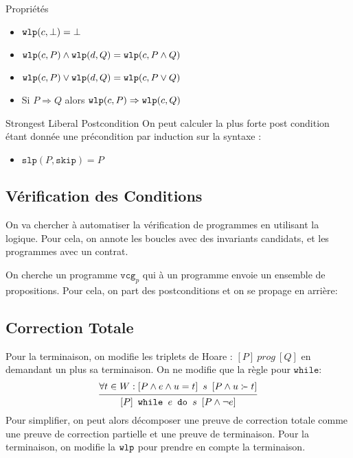 \documentclass{cours}
\begin{document}
\begin{propositionfr}{Propriétés}{}
	\begin{itemize}
		\item $\texttt{wlp}(c, \bot) = \bot$
		\item $\texttt{wlp}(c, P) \land \texttt{wlp}(d, Q) = \texttt{wlp}(c, P \land Q)$
		\item $\texttt{wlp}(c, P) \lor \texttt{wlp}(d, Q) = \texttt{wlp}(c, P \lor Q)$
		\item Si $P \Rightarrow Q$ alors $\texttt{wlp}(c, P) \Rightarrow \texttt{wlp}(c, Q)$
	\end{itemize}
	
\end{propositionfr}
\newcommand{\slp}{\texttt{slp}}
\begin{définition}
	{Strongest Liberal Postcondition}{}
	On peut calculer la plus forte post condition étant donnée une précondition par induction sur la syntaxe : 
	\begin{itemize}
		\item $\slp(P, \texttt{skip}) = P$
	\end{itemize}
\end{définition}

\subsection{Vérification des Conditions}
On va chercher à automatiser la vérification de programmes en utilisant la logique. 
Pour cela, on annote les boucles avec des invariants candidats, et les programmes avec un contrat. 

\newcommand{\vcg}{\texttt{vcg}}
On cherche un programme $\vcg_{p}$ qui à un programme envoie un ensemble de propositions. Pour cela, on part des postconditions et on se propage en arrière:



\subsection{Correction Totale}
\newcommand{\boar}[3]{\left[#1\right] \ #2 \ \left[#3\right]}
Pour la terminaison, on modifie les triplets de Hoare : $\boar{P}{prog}{Q}$ en demandant un plus sa terminaison.
On ne modifie que la règle pour $\texttt{while}$:
\begin{equation*}
	\begin{prooftree}
		\hypo{\forall t \in W: \boar{P \land e \land u = t}{s}{P \land u \succ t}}
		\infer1{\boar{P}{\texttt{while } e \texttt{ do } s}{P \land \lnot e}}
	\end{prooftree}
\end{equation*}
Pour simplifier, on peut alors décomposer une preuve de correction totale comme une preuve de correction partielle et une preuve de terminaison.
Pour la terminaison, on modifie la $\texttt{wlp}$ pour prendre en compte la terminaison. 
\end{document}
